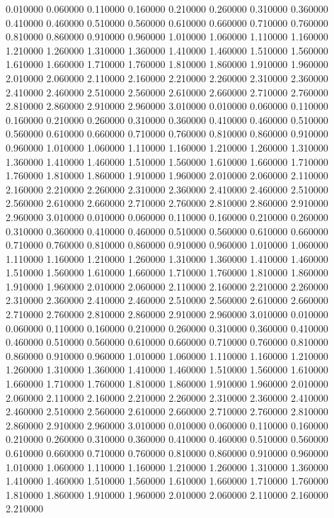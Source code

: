 0.010000
0.060000
0.110000
0.160000
0.210000
0.260000
0.310000
0.360000
0.410000
0.460000
0.510000
0.560000
0.610000
0.660000
0.710000
0.760000
0.810000
0.860000
0.910000
0.960000
1.010000
1.060000
1.110000
1.160000
1.210000
1.260000
1.310000
1.360000
1.410000
1.460000
1.510000
1.560000
1.610000
1.660000
1.710000
1.760000
1.810000
1.860000
1.910000
1.960000
2.010000
2.060000
2.110000
2.160000
2.210000
2.260000
2.310000
2.360000
2.410000
2.460000
2.510000
2.560000
2.610000
2.660000
2.710000
2.760000
2.810000
2.860000
2.910000
2.960000
3.010000
0.010000
0.060000
0.110000
0.160000
0.210000
0.260000
0.310000
0.360000
0.410000
0.460000
0.510000
0.560000
0.610000
0.660000
0.710000
0.760000
0.810000
0.860000
0.910000
0.960000
1.010000
1.060000
1.110000
1.160000
1.210000
1.260000
1.310000
1.360000
1.410000
1.460000
1.510000
1.560000
1.610000
1.660000
1.710000
1.760000
1.810000
1.860000
1.910000
1.960000
2.010000
2.060000
2.110000
2.160000
2.210000
2.260000
2.310000
2.360000
2.410000
2.460000
2.510000
2.560000
2.610000
2.660000
2.710000
2.760000
2.810000
2.860000
2.910000
2.960000
3.010000
0.010000
0.060000
0.110000
0.160000
0.210000
0.260000
0.310000
0.360000
0.410000
0.460000
0.510000
0.560000
0.610000
0.660000
0.710000
0.760000
0.810000
0.860000
0.910000
0.960000
1.010000
1.060000
1.110000
1.160000
1.210000
1.260000
1.310000
1.360000
1.410000
1.460000
1.510000
1.560000
1.610000
1.660000
1.710000
1.760000
1.810000
1.860000
1.910000
1.960000
2.010000
2.060000
2.110000
2.160000
2.210000
2.260000
2.310000
2.360000
2.410000
2.460000
2.510000
2.560000
2.610000
2.660000
2.710000
2.760000
2.810000
2.860000
2.910000
2.960000
3.010000
0.010000
0.060000
0.110000
0.160000
0.210000
0.260000
0.310000
0.360000
0.410000
0.460000
0.510000
0.560000
0.610000
0.660000
0.710000
0.760000
0.810000
0.860000
0.910000
0.960000
1.010000
1.060000
1.110000
1.160000
1.210000
1.260000
1.310000
1.360000
1.410000
1.460000
1.510000
1.560000
1.610000
1.660000
1.710000
1.760000
1.810000
1.860000
1.910000
1.960000
2.010000
2.060000
2.110000
2.160000
2.210000
2.260000
2.310000
2.360000
2.410000
2.460000
2.510000
2.560000
2.610000
2.660000
2.710000
2.760000
2.810000
2.860000
2.910000
2.960000
3.010000
0.010000
0.060000
0.110000
0.160000
0.210000
0.260000
0.310000
0.360000
0.410000
0.460000
0.510000
0.560000
0.610000
0.660000
0.710000
0.760000
0.810000
0.860000
0.910000
0.960000
1.010000
1.060000
1.110000
1.160000
1.210000
1.260000
1.310000
1.360000
1.410000
1.460000
1.510000
1.560000
1.610000
1.660000
1.710000
1.760000
1.810000
1.860000
1.910000
1.960000
2.010000
2.060000
2.110000
2.160000
2.210000
